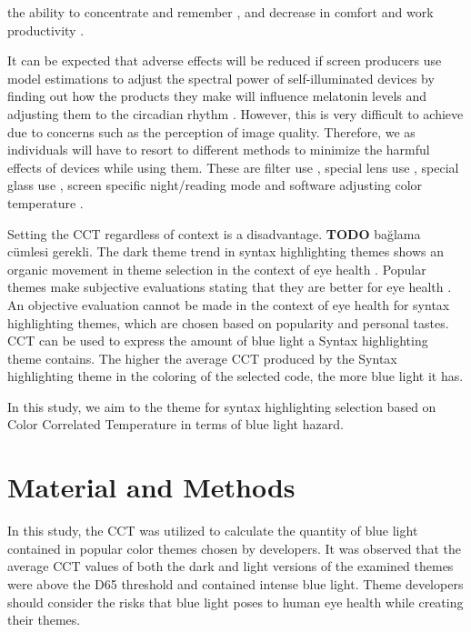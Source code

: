 \documentclass{article}
\begin{document}
the ability to concentrate and remember \cite{cohen2011}, and decrease in comfort and work productivity \cite{conlon1998, kurimoto1986, anshel2007, stoner2002}. 

It can be expected that adverse effects will be reduced if screen producers use model estimations to adjust the spectral power of self-illuminated devices by finding out how the products they make will influence melatonin levels and adjusting them to the circadian rhythm \cite{wood2012}. However, this is very difficult to achieve due to concerns such as the perception of image quality. Therefore, we as individuals will have to resort to different methods to minimize the harmful effects of devices while using them. These are filter use \cite{mortazavi2018, heiting2020}, special lens use \cite{sano2014}, special glass use \cite{heiting2020, lely2014}, screen specific night/reading mode \cite{sanz2020, teran2020} and software adjusting color temperature \cite{sanz2020}.
 
Setting the CCT regardless of context is a disadvantage. \textbf{TODO} bağlama cümlesi gerekli. The dark theme trend in syntax highlighting themes shows an organic movement in theme selection in the context of eye health \cite{suraj2020dark, coyier2013poll}. Popular themes make subjective evaluations stating that they are better for eye health \cite{}. An objective evaluation cannot be made in the context of eye health for syntax highlighting themes, which are chosen based on popularity and personal tastes. CCT can be used to express the amount of blue light a Syntax highlighting theme contains. The higher the average CCT produced by the Syntax highlighting theme in the coloring of the selected code, the more blue light it has. 

In this study, we aim to the theme for syntax highlighting selection based on Color Correlated Temperature in terms of blue light hazard.

\section{Material and Methods} \label{sec:material-methods}

In this study, the CCT was utilized to calculate the quantity of blue light contained in popular color themes chosen by developers. It was observed that the average CCT values of both the dark and light versions of the examined themes were above the D65 threshold and contained intense blue light. Theme developers should consider the risks that blue light poses to human eye health while creating their themes.
\end{document}
